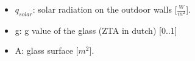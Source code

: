 \begin{itemize}
    \item $q_{solar}$: solar radiation on the outdoor walls [$\frac{W}{m^2}$]. 
    \item g: g value of the glass (ZTA in dutch) [0..1]\cite{zontoetreding}
    \item A: glass surface [$m^2$].
\end{itemize}


\newpage